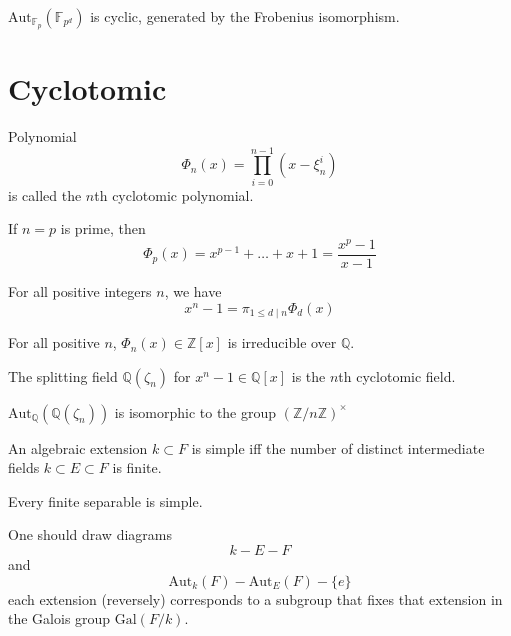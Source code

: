\documentclass[openany]{book}
\newcommand{\Z}{\mathbb{Z}}
\newcommand{\F}{\mathbb{F}}
\newcommand{\Q}{\mathbb{Q}}
\newcommand{\gal}{\text{Gal}}
\begin{document}
\begin{thm}
    $\text{Aut}_{\F_p}(\F_{p^d})$ is cyclic, generated by the Frobenius isomorphism.
\end{thm}

\section{Cyclotomic}
\begin{defn}
    Polynomial 
    \begin{equation*}
        \Phi_n(x)=\prod_{i=0}^{n-1}(x-\xi_n^i)
    \end{equation*}
    is called the $n$th cyclotomic polynomial.
\end{defn}

\begin{prop}
    If $n=p$ is prime, then 
    \begin{equation*}
        \Phi_p(x)=x^{p-1}+\dots+x+1=\frac{x^p-1}{x-1}
    \end{equation*}

    For all positive integers $n$, we have 
    \begin{equation*}
        x^n-1=\pi_{1\leq d\mid n}\Phi_d(x)
    \end{equation*}
\end{prop}


\begin{prop}
    For all positive $n$, $\Phi_n(x)\in\Z[x]$ is irreducible over $\Q$.
\end{prop}

\begin{defn}
    The splitting field $\Q(\zeta_n)$  for $x^n-1\in\Q[x]$  is the $n$th cyclotomic field. 
\end{defn}

\begin{prop}
    $\text{Aut}_\Q(\Q(\zeta_n))$ is isomorphic to the group $(\Z/n\Z)^\times$
\end{prop}



\begin{prop}
    An algebraic extension $k\subset F$ is simple iff the number of distinct intermediate fields $k\subset E\subset F$ is finite.
\end{prop}

\begin{thm}
    Every finite separable is simple.
\end{thm}

One should draw diagrams 
\begin{equation*}
    k-E-F
\end{equation*}
and 
\begin{equation*}
    \text{Aut}_k(F)-\text{Aut}_E(F)-\{e\}
\end{equation*}
each extension (reversely) corresponds to a subgroup that fixes that extension in the Galois group $\gal(F/k)$.
\end{document}
